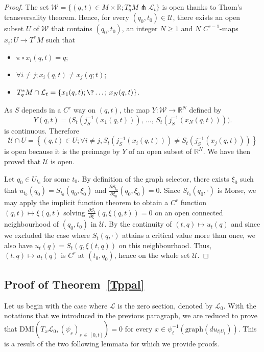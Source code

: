 \documentclass[AHL, Unicode, longabstracts, published]{cedram}
\newcommand*\cl{\mathcal{L}}
\newcommand*\cU{\mathcal{U}}
\newcommand*\cw{\mathcal{W}}
\newcommand*\cal{\mathcal}
\newcommand{\DMI}{\mathrm{DMI}}
\newcommand{\Graph}{\mathrm{graph}}
\newcommand*\R{\mathbb{R}}
\let\oldforall\forall
\renewcommand*{\forall}{\mathrel{\oldforall}}
\begin{document}
\begin{proof}
The set $\cw=\{ (q, t)\in M\times \R;T_q^\star M \pitchfork {\cl_t}\} $ is open thanks to Thom's transversality theorem. Hence, for every $(q_0, t_0)\in \cU$, there exists an open subset $U$ of $\cw$ that contains $(q_0, t_0)$, an integer $N\geq 1$ and $N$ $C^{r-1}$-maps $x_i:U\to T^*M$ such that
\begin{itemize}
\item $\pi\circ x_i(q, t)=q$;
\item $\forall i\neq j; x_i(q, t)\neq x_j(q;t)$;
\item $T^*_qM\cap \cl_t=\{ x_1(q, t);\?\dots;\, x_N(q, t)\}$.
\end{itemize}
As $S$ depends in a $C^r$ way on $(q, t)$, the map $Y: \cw\to \R^N$ defined by
\[
Y(q,t)=\big(S_t\left(j_S^{-1}(x_1(q,t))\right),\,\dots,\,S_t\left(j_S^{-1}(x_N(q,t))\right)\big).
\]
is continuous. Therefore
\[
\cU\cap U=\left\{ (q,t)\in U; \forall i\neq j, S_t\left(j_S^{-1}(x_i(q,t))\right)\neq S_t\left(j_S^{-1}(x_j(q,t))\right)\right\}
\]
is open because it is the preimage by $Y$ of an open subset of $\R^N$. We have then proved that $\cal U$ is open. 



Let $q_0 \in U_{t_0}$ for some $t_0$. By definition of the graph selector, there exists $\xi_0$ such that $u_{t_0}(q_0)=S_{t_0}(q_0,\xi_0)$ and $\frac{\partial S_{t_0}}{\partial \xi_0}(q_0,\xi_0)=0$. Since $S_{t_0}(q_0,\cdot)$ is Morse, we may apply the implicit function theorem to obtain a {$C^r$} function $(q,t)\mapsto \xi(q,t)$ solving $\frac{\partial S_t}{\partial \xi}(q,\xi(q,t))=0$ on an open {connected} neighbourhood of $(q_0, t_0)$ {in $\cal U$}. By the continuity of $(t,q)\mapsto u_t(q)$ and since we excluded the case where $S_t(q,\cdot)$ attains a critical value more than once, we also have $u_t(q)=S_t(q,\xi(t,q))$ on this neighbourhood. Thus, $(t,q)\mapsto u_t(q)$ is {$C^r$} at $(t_0,q_0)$, hence on the whole set $\cal U$.
\end{proof}





\subsection{Proof of Theorem~\ref{Tppal}}


Let us begin with the case where $\cl$ is the zero section, denoted by $\cl_0$. With the notations that we introduced in the previous paragraph, we are reduced to prove that $\DMI(T_x\cl_0,(\psi_s)_{s\,\in\,[0,t]})=0$ for every $x\in \psi_{t}^{-1}(\Graph(du_{t|U_t}))$. This is a result of the two following lemmata for which we provide proofs.
\end{document}
